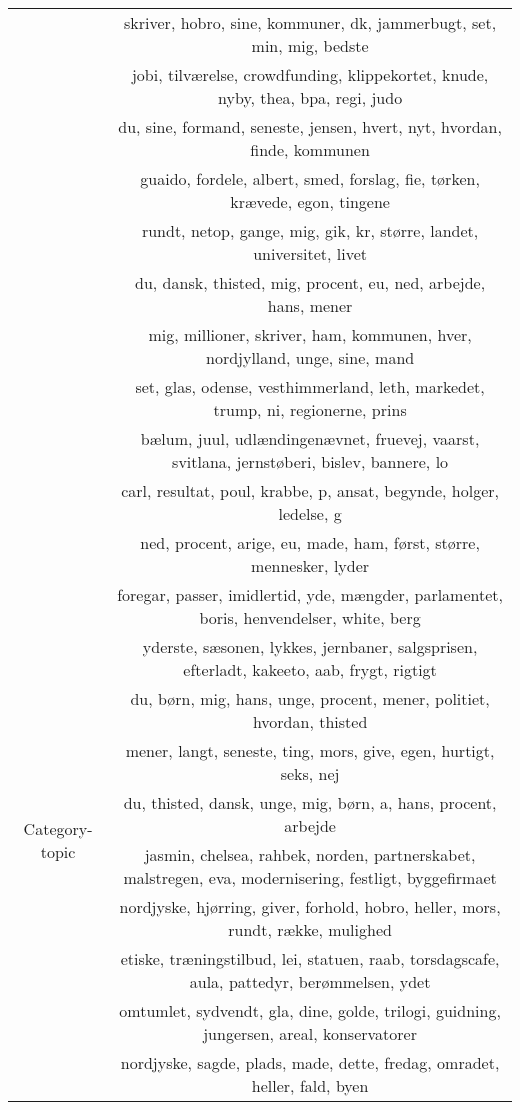 \begin{table}
\begin{tabular}{c|c}
		& skriver, hobro, sine, kommuner, dk, jammerbugt, set, min, mig, bedste \\
		& jobi, tilværelse, crowdfunding, klippekortet, knude, nyby, thea, bpa, regi, judo \\
		& du, sine, formand, seneste, jensen, hvert, nyt, hvordan, finde, kommunen \\
		& guaido, fordele, albert, smed, forslag, fie, tørken, krævede, egon, tingene \\
		& rundt, netop, gange, mig, gik, kr, større, landet, universitet, livet \\
		& du, dansk, thisted, mig, procent, eu, ned, arbejde, hans, mener \\
		& mig, millioner, skriver, ham, kommunen, hver, nordjylland, unge, sine, mand \\
		& set, glas, odense, vesthimmerland, leth, markedet, trump, ni, regionerne, prins \\
		& bælum, juul, udlændingenævnet, fruevej, vaarst, svitlana, jernstøberi, bislev, bannere, lo \\
		& carl, resultat, poul, krabbe, p, ansat, begynde, holger, ledelse, g \\
		& ned, procent, arige, eu, made, ham, først, større, mennesker, lyder \\
		\midrule
		\multirow{15}{*}{Category-topic} & foregar, passer, imidlertid, yde, mængder, parlamentet, boris, henvendelser, white, berg \\
		& yderste, sæsonen, lykkes, jernbaner, salgsprisen, efterladt, kakeeto, aab, frygt, rigtigt \\
		& du, børn, mig, hans, unge, procent, mener, politiet, hvordan, thisted \\
		& mener, langt, seneste, ting, mors, give, egen, hurtigt, seks, nej \\
		& du, thisted, dansk, unge, mig, børn, a, hans, procent, arbejde \\
		& jasmin, chelsea, rahbek, norden, partnerskabet, malstregen, eva, modernisering, festligt, byggefirmaet \\
		& nordjyske, hjørring, giver, forhold, hobro, heller, mors, rundt, række, mulighed \\
		& etiske, træningstilbud, lei, statuen, raab, torsdagscafe, aula, pattedyr, berømmelsen, ydet \\
		& omtumlet, sydvendt, gla, dine, golde, trilogi, guidning, jungersen, areal, konservatorer \\
		& nordjyske, sagde, plads, made, dette, fredag, omradet, heller, fald, byen \\

\end{tabular}
\end{table}
